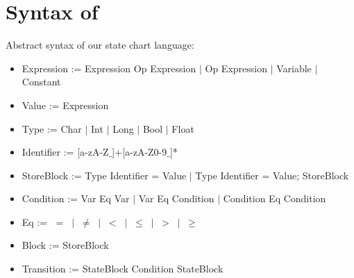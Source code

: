 \section{Syntax of \plcchart}

Abstract syntax of our state chart language:

\begin{itemize}
	\item Expression := Expression Op Expression $\mid$ Op Expression $\mid$ Variable $\mid$ Constant
	\item Value := Expression
	\item Type := Char $\mid$ Int $\mid$ Long $\mid$ Bool $\mid$ Float
	\item Identifier := [a-zA-Z$\_$]+[a-zA-Z0-9$\_$]*  
	
	\item StoreBlock := Type Identifier = Value $\mid$ Type Identifier = Value; StoreBlock

	\item Condition := Var Eq Var $\mid$ Var Eq Condition $\mid$ Condition Eq Condition
	
	\item Eq := $\; = \; \mid \; \neq \; \mid \; < \; \mid \; \leq \; \mid \; > \; \mid \; \geq$	

	\item Block := StoreBlock	
	
	\item Transition := StateBlock Condition StateBlock
\end{itemize}

